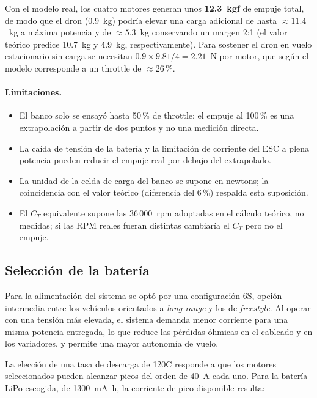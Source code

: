 \documentclass[12pt, letterpaper]{report}
\begin{document}
Con el modelo real, los cuatro motores generan unos \textbf{12.3~kgf} de empuje total, de modo que el dron (0.9~kg) podría elevar una carga adicional de hasta $\approx 11.4$~kg a máxima potencia y de $\approx 5.3$~kg conservando un margen 2:1 (el valor teórico predice 10.7~kg y 4.9~kg, respectivamente). Para sostener el dron en vuelo estacionario sin carga se necesitan $0.9 \times 9.81/4 = 2.21$~N por motor, que según el modelo corresponde a un throttle de $\approx 26\,\text{\%}$.

\paragraph{Limitaciones.}
\begin{itemize}
    \item El banco solo se ensayó hasta 50\,\% de throttle: el empuje al 100\,\% es una extrapolación a partir de dos puntos y no una medición directa.
    \item La caída de tensión de la batería y la limitación de corriente del ESC a plena potencia pueden reducir el empuje real por debajo del extrapolado.
    \item La unidad de la celda de carga del banco se supone en newtons; la coincidencia con el valor teórico (diferencia del 6\,\%) respalda esta suposición.
    \item El $C_T$ equivalente supone las 36\,000~rpm adoptadas en el cálculo teórico, no medidas; si las RPM reales fueran distintas cambiaría el $C_T$ pero no el empuje.
\end{itemize}

\subsection{Selección de la batería}

Para la alimentación del sistema se optó por una configuración 6S, opción 
intermedia entre los vehículos orientados a \textit{long range} y los de 
\textit{freestyle}. Al operar con una tensión más elevada, el sistema demanda 
menor corriente para una misma potencia entregada, lo que reduce las pérdidas 
óhmicas en el cableado y en los variadores, y permite una mayor autonomía de 
vuelo.

La elección de una tasa de descarga de 120C responde a que los motores 
seleccionados pueden alcanzar picos del orden de \SI{40}{\ampere} cada uno. 
Para la batería LiPo escogida, de \SI{1300}{\milli\ampere\hour}, la corriente 
de pico disponible resulta:
\end{document}
